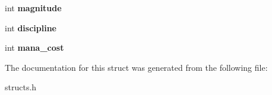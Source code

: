 \begin{DoxyCompactItemize}
\item 
\hypertarget{structaffect__spell__type_ae0f2dd82b7a861879bf6319f9e73dd75}{int {\bfseries magnitude}}\label{structaffect__spell__type_ae0f2dd82b7a861879bf6319f9e73dd75}

\item 
\hypertarget{structaffect__spell__type_a4add0fdecc1994ad0f39cd3ca91194d5}{int {\bfseries discipline}}\label{structaffect__spell__type_a4add0fdecc1994ad0f39cd3ca91194d5}

\item 
\hypertarget{structaffect__spell__type_adebe05ba6cb1f05d1c55f825d9e7734d}{int {\bfseries mana\-\_\-cost}}\label{structaffect__spell__type_adebe05ba6cb1f05d1c55f825d9e7734d}

\end{DoxyCompactItemize}


The documentation for this struct was generated from the following file\-:\begin{DoxyCompactItemize}
\item 
structs.\-h\end{DoxyCompactItemize}
